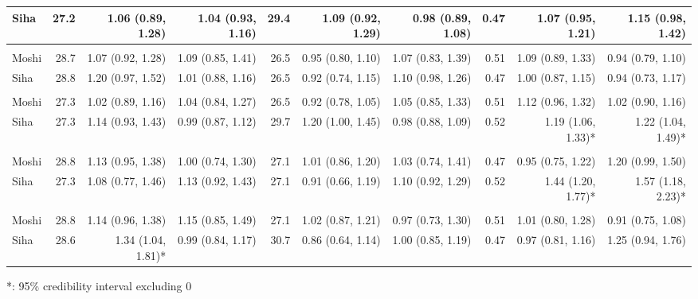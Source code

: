 \begin{table}[t]
\begin{tabular*}{\linewidth}{@{\extracolsep{\fill}}l|rrrrrrrrr}
Siha & 27.2 & 1.06 (0.89, 1.28)  & 1.04 (0.93, 1.16)  & 29.4 & 1.09 (0.92, 1.29)  & 0.98 (0.89, 1.08)  & 0.47 & 1.07 (0.95, 1.21)  & 1.15 (0.98, 1.42)  \\ 
\midrule\addlinespace[2.5pt]
\multicolumn{10}{l}{Diarrhea} \\[2.5pt] 
\midrule\addlinespace[2.5pt]
Moshi & 28.7 & 1.07 (0.92, 1.28)  & 1.09 (0.85, 1.41)  & 26.5 & 0.95 (0.80, 1.10)  & 1.07 (0.83, 1.39)  & 0.51 & 1.09 (0.89, 1.33)  & 0.94 (0.79, 1.10)  \\ 
Siha & 28.8 & 1.20 (0.97, 1.52)  & 1.01 (0.88, 1.16)  & 26.5 & 0.92 (0.74, 1.15)  & 1.10 (0.98, 1.26)  & 0.47 & 1.00 (0.87, 1.15)  & 0.94 (0.73, 1.17)  \\ 
\midrule\addlinespace[2.5pt]
\multicolumn{10}{l}{Urinary Tract Infections} \\[2.5pt] 
\midrule\addlinespace[2.5pt]
Moshi & 27.3 & 1.02 (0.89, 1.16)  & 1.04 (0.84, 1.27)  & 26.5 & 0.92 (0.78, 1.05)  & 1.05 (0.85, 1.33)  & 0.51 & 1.12 (0.96, 1.32)  & 1.02 (0.90, 1.16)  \\ 
Siha & 27.3 & 1.14 (0.93, 1.43)  & 0.99 (0.87, 1.12)  & 29.7 & 1.20 (1.00, 1.45)  & 0.98 (0.88, 1.09)  & 0.52 & 1.19 (1.06, 1.33)* & 1.22 (1.04, 1.49)* \\ 
\midrule\addlinespace[2.5pt]
\multicolumn{10}{l}{Malaria} \\[2.5pt] 
\midrule\addlinespace[2.5pt]
Moshi & 28.8 & 1.13 (0.95, 1.38)  & 1.00 (0.74, 1.30)  & 27.1 & 1.01 (0.86, 1.20)  & 1.03 (0.74, 1.41)  & 0.47 & 0.95 (0.75, 1.22)  & 1.20 (0.99, 1.50)  \\ 
Siha & 27.3 & 1.08 (0.77, 1.46)  & 1.13 (0.92, 1.43)  & 27.1 & 0.91 (0.66, 1.19)  & 1.10 (0.92, 1.29)  & 0.52 & 1.44 (1.20, 1.77)* & 1.57 (1.18, 2.23)* \\ 
\midrule\addlinespace[2.5pt]
\multicolumn{10}{l}{Infectious Eye Disease} \\[2.5pt] 
\midrule\addlinespace[2.5pt]
Moshi & 28.8 & 1.14 (0.96, 1.38)  & 1.15 (0.85, 1.49)  & 27.1 & 1.02 (0.87, 1.21)  & 0.97 (0.73, 1.30)  & 0.51 & 1.01 (0.80, 1.28)  & 0.91 (0.75, 1.08)  \\ 
Siha & 28.6 & 1.34 (1.04, 1.81)* & 0.99 (0.84, 1.17)  & 30.7 & 0.86 (0.64, 1.14)  & 1.00 (0.85, 1.19)  & 0.47 & 0.97 (0.81, 1.16)  & 1.25 (0.94, 1.76)  \\ 
\bottomrule
\end{tabular*}
\begin{minipage}{\linewidth}
*: 95\% credibility interval excluding 0\\
\end{minipage}
\end{table}

